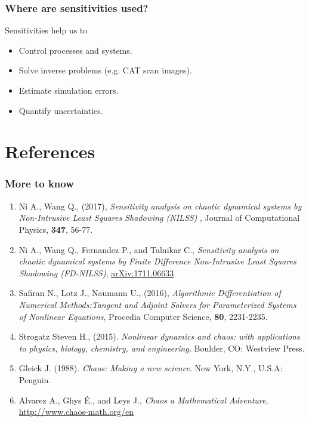 \documentclass{beamer}
\begin{document}
\begin{frame}
  \frametitle{Where are sensitivities used?}
  Sensitivities help us to\\
  \begin{itemize}
    \item Control processes and systems.
    \item Solve inverse problems (e.g. CAT scan images).
    \item Estimate simulation errors.
    \item Quantify uncertainties.
  \end{itemize}
\end{frame}


\section{References}
\begin{frame}
  \frametitle{More to know}
  \begin{scriptsize}
  \begin{enumerate}
    \item Ni A., Wang Q., (2017), \textit{Sensitivity analysis on chaotic dynamical systems by Non-Intrusive Least Squares Shadowing (NILSS)} , Journal of Computational Physics, \textbf{347}, 56-77.
    \item {Ni} A., {Wang} Q., {Fernandez} P., and {Talnikar} C., \textit{Sensitivity analysis on chaotic dynamical systems by Finite Difference Non-Intrusive Least Squares Shadowing (FD-NILSS)}, \url{arXiv:1711.06633}
    \item Safiran N., Lotz J., Naumann U., (2016), \textit{Algorithmic Differentiation of Numerical Methods:Tangent and Adjoint Solvers for Parameterized Systems of Nonlinear Equations}, Procedia Computer Science, \textbf{80}, 2231-2235.
    \item Strogatz Steven H., (2015). \textit{Nonlinear dynamics and chaos: with applications to physics, biology, chemistry, and engineering.} Boulder, CO: Westview Press.
    \item Gleick J. (1988). \textit{Chaos: Making a new science}. New York, N.Y., U.S.A: Penguin.
    \item Alvarez A., Ghys É., and Leys J., \textit{Chaos a Mathematical Adventure}, \url{http://www.chaos-math.org/en}
  \end{enumerate}
\end{scriptsize}
\end{frame}
\end{document}
